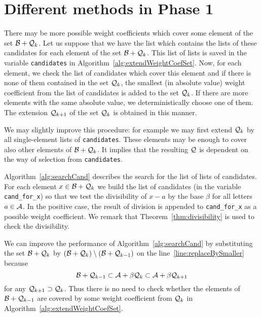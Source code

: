 \section{Different methods in Phase 1}
\label{sec:methodsOne}

\begin{upravit}

There may be more possible weight coefficients which cover some element of the set $\mathcal{B}+ \mathcal{Q}_k$. Let us suppose that we have the list which contains the lists of these candidates for each element of the set $\mathcal{B}+ \mathcal{Q}_k$. This list of lists is saved in the variable \verb+candidates+ in Algorithm~\ref{alg:extendWeightCoefSet}. Now, for each element, we check the list of candidates which cover this element and if there is none of them contained in the set $\mathcal{Q}_k$, the smallest (in absolute value) weight coefficient from the list of candidates is added to the set $\mathcal{Q}_k$. If there are more elements with the same absolute value, we deterministically choose one of them. The extension $\mathcal{Q}_{k+1}$ of the set $\mathcal{Q}_k$ is obtained in this manner.   

We may slightly improve this procedure: for example we may first extend $\mathcal{Q}_{k}$ by all single-element lists of \verb+candidates+. These elements may be enough to cover also other elements of $\mathcal{B}+\mathcal{Q}_{k}$. It implies that the resulting $\mathcal{Q}$ is dependent on the way of selection from \verb+candidates+.

Algorithm~\ref{alg:searchCand} describes the search for the list of lists of candidates. For each element $x\in \mathcal{B} + \mathcal{Q}_{k}$ we build the list of candidates (in the variable \verb+cand_for_x+) so that we test the divisibility of $x-a$ by the base $\beta$ for all letters $a\in\mathcal{A}$. In the positive case, the result of division is appended to \verb+cand_for_x+ as a possible weight coefficient. We remark that Theorem~\ref{thm:divisibility} is used to check the divisibility.

We can improve the performance of Algorithm~\ref{alg:searchCand} by substituting the set $\mathcal{B} + \mathcal{Q}_{k}$ by $(\mathcal{B} + \mathcal{Q}_{k})\setminus (\mathcal{B} + \mathcal{Q}_{k-1})$ on the line~\ref{line:replaceBySmaller} because
$$
\mathcal{B} + \mathcal{Q}_{k-1} \subset \mathcal{A} + \beta \mathcal{Q}_{k} \subset \mathcal{A} + \beta \mathcal{Q}_{k+1}
$$
for any $\mathcal{Q}_{k+1} \supset \mathcal{Q}_{k}$. Thus there is no need to check whether the elements of $\mathcal{B} + \mathcal{Q}_{k-1}$ are covered by some weight coefficient from $\mathcal{Q}_k$ in Algorithm~\ref{alg:extendWeightCoefSet}.

\end{upravit}
